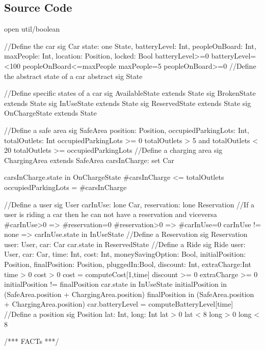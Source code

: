 \documentclass[11pt,a4paper]{report}
\begin{document}
\subsection{Source Code}
\begin{alloyCode}
open util/boolean

//Define the car
sig Car{
	state: one State,
	batteryLevel: Int,
	peopleOnBoard: Int,
	maxPeople: Int,
	location: Position,
	locked: Bool
}
{
    batteryLevel>=0
	batteryLevel=<100
	peopleOnBoard<=maxPeople
	maxPeople=5
	peopleOnBoard>=0
}
//Define the abstract state of a car
abstract sig State{ }

//Define specific states of a car
sig AvailableState extends State{ }
sig BrokenState extends State{ }
sig InUseState extends State{ }
sig ReservedState extends State{ }
sig OnChargeState extends State{ }

//Define a safe area
sig SafeArea{
	position: Position,
	occupiedParkingLots: Int,
	totalOutlets: Int
}	
{
	occupiedParkingLots >= 0
	totalOutlets > 5 and totalOutlets < 20
	totalOutlets >= occupiedParkingLots
}
//Define a charging area
sig ChargingArea extends SafeArea{
	carsInCharge: set Car
} 
{
	carsInCharge.state in OnChargeState
	#carsInCharge <= totalOutlets
	occupiedParkingLots = #carsInCharge

}
//Define a user
sig User{
	carInUse: lone Car,
	reservation: lone Reservation
}
{
	//If a user is riding a car then he can not have a reservation and viceversa
	#carInUse>0 => #reservation=0	
	#reservation>0 => #carInUse=0 
	carInUse != none => carInUse.state in InUseState
}
//Define a Reservation
sig Reservation{
	user: User,
	car: Car
}
{
	car.state in ReservedState
}
//Define a Ride
sig Ride{
	user: User,
	car: Car,
	time: Int, 
	cost: Int, 
	moneySavingOption: Bool, 
	initialPosition: Position,
	finalPosition: Position,
	pluggedIn:Bool,
	discount: Int,
	extraCharge:Int
}
{
	time > 0
	cost > 0
	cost = computeCost[1,time]
	discount >= 0
	extraCharge >= 0
	initialPosition != finalPosition
	car.state in InUseState
	initialPosition in (SafeArea.position + ChargingArea.position)
	finalPosition in (SafeArea.position + ChargingArea.position)
	car.batteryLevel = computeBatteryLevel[time] 
}
//Define a position
sig Position{
	lat: Int,
	long: Int
} 
{
	lat > 0
	lat < 8 
	long > 0
	long < 8
}


/***   FACTs   ***/



\end{alloyCode}
\end{document}
